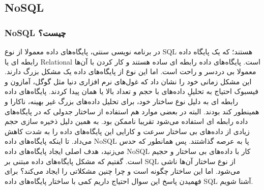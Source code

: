 \subsection{NoSQL}
\subsubsection{NoSQL چیست؟}
در برنامه نویسی سنتی، پایگاه‌های داده معمولا از نوع SQL هستند؛ که یک پایگاه داده رابطه ای یا Relational است. پایگاه‌های داده رابطه ای ساده هستند و کار کردن با آن‌ها معمولا بی دردسر و راحت است. اما این نوع از پایگاه‌های داده یک مشکل بزرگ دارند. این مشکل زمانی خود را نشان داد که غول‌های نرم افزاری دنیا مثل گوگل، آمازون و فیسبوک احتیاج به تحلیلِ داده‌های با حجم و تعداد بالا یا همان
 پیدا کردند.
پایگاه‌های داده رابطه ای به دلیل نوع ساختار خود، برای تحلیل داده‌های بزرگ غیر بهینه، ناکارا و همینطور کند بودند. البته در بعضی موارد هم استفاده از ساختار جدولی که در پایگاه‌های داده رابطه ای استفاده می‌شود تقریبا ناممکن بود. به همین دلیل ذخیره سازی حجم زیادی از داده‌های بی ساختار
 سرعت و کارایی این پایگاه‌های داده را به شدت کاهش می‌داد. تا اینکه پایگاه‌های داده NoSQL پا به عرصه گذاشتند. پس همانطور که حدس می‌زنید، هدف اصلی ایجاد پایگاه‌های داده NoSQL کار با داده‌های بی ساختار و حجیم است.
گفتیم که مشکل پایگاه‌های داده مبتنی بر SQL از نوع ساختار آن‌ها ناشی می‌شود. اما این ساختار چگونه است و چرا چنین مشکلاتی را ایجاد می‌کند؟ برای فهمیدن پاسخ این سوال احتیاج داریم کمی با ساختار پایگاه‌های داده SQL آشنا شویم.

